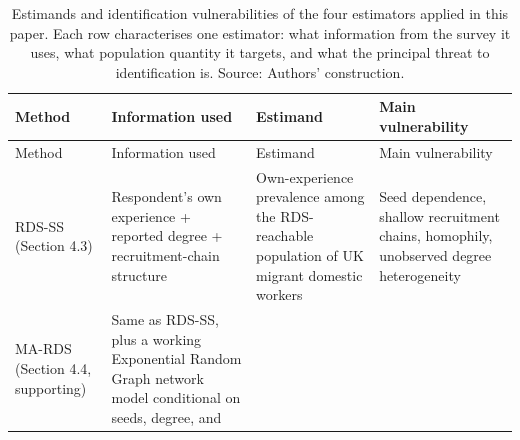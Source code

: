 \documentclass[
  12pt,
  letterpaper,
  DIV=11,
  numbers=noendperiod]{scrartcl}
\begin{document}
\begin{longtable}[]{@{}
  >{\raggedright\arraybackslash}p{}
  >{\raggedright\arraybackslash}p{}
  >{\raggedright\arraybackslash}p{}
  >{\raggedright\arraybackslash}p{}@{}}
\caption{Estimands and identification vulnerabilities of the four
estimators applied in this paper. Each row characterises one estimator:
what information from the survey it uses, what population quantity it
targets, and what the principal threat to identification is. Source:
Authors' construction.}\tabularnewline
\toprule\noalign{}
\begin{minipage}[b]{\linewidth}\raggedright
Method
\end{minipage} & \begin{minipage}[b]{\linewidth}\raggedright
Information used
\end{minipage} & \begin{minipage}[b]{\linewidth}\raggedright
Estimand
\end{minipage} & \begin{minipage}[b]{\linewidth}\raggedright
Main vulnerability
\end{minipage} \\
\midrule\noalign{}
\endfirsthead
\toprule\noalign{}
\begin{minipage}[b]{\linewidth}\raggedright
Method
\end{minipage} & \begin{minipage}[b]{\linewidth}\raggedright
Information used
\end{minipage} & \begin{minipage}[b]{\linewidth}\raggedright
Estimand
\end{minipage} & \begin{minipage}[b]{\linewidth}\raggedright
Main vulnerability
\end{minipage} \\
\midrule\noalign{}
\endhead
\bottomrule\noalign{}
\endlastfoot
RDS-SS (Section 4.3) & Respondent's own experience + reported degree +
recruitment-chain structure & Own-experience prevalence among the
RDS-reachable population of UK migrant domestic workers & Seed
dependence, shallow recruitment chains, homophily, unobserved degree
heterogeneity \\
MA-RDS (Section 4.4, supporting) & Same as RDS-SS, plus a working
Exponential Random Graph network model conditional on seeds, degree, and

\end{longtable}
\end{document}
